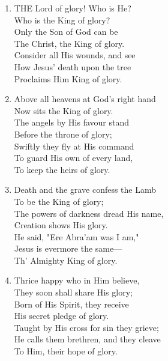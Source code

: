 \documentclass[11pt,a4paper]{article}
\begin{document}
\begin{enumerate}
    \item THE Lord of glory! Who is He? \\
        Who is the King of glory? \\
        Only the Son of God can be \\
        The Christ, the King of glory. \\
        Consider all His wounds, and see \\
        How Jesus' death upon the tree \\
        Proclaims Him King of glory.

    \item Above all heavens at God's right hand \\
        Now sits the King of glory. \\
        The angels by His favour stand \\
        Before the throne of glory; \\
        Swiftly they fly at His command \\
        To guard His own of every land, \\
        To keep the heirs of glory.

    \item Death and the grave confess the Lamb \\
        To be the King of glory; \\
        The powers of darkness dread His name, \\
        Creation shows His glory. \\
        He said, "Ere Abra'am was I am," \\
        Jesus is evermore the same--- \\
        Th' Almighty King of glory.

    \item Thrice happy who in Him believe, \\
        They soon shall share His glory; \\
        Born of His Spirit, they receive \\
        His secret pledge of glory. \\
        Taught by His cross for sin they grieve; \\
        He calls them brethren, and they cleave \\
        To Him, their hope of glory.

\end{enumerate}
\end{document}
